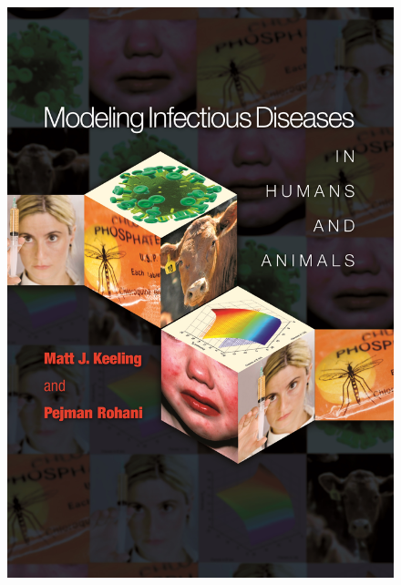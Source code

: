 \documentclass[
  ignorenonframetext,
]{beamer}
\begin{document}
\begin{frame}
\begin{figure}

\begin{minipage}{0.50\linewidth}
\includegraphics{images/Rohani_and_Keeling.jpeg}\end{minipage}%
%
\begin{minipage}{0.50\linewidth}

\end{minipage}
\end{figure}
\end{frame}
\end{document}
